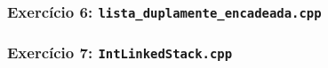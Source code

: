 \documentclass[aspectratio=169]{beamer}
\begin{document}
\begin{frame}[fragile]\frametitle{Exercício 6: \texttt{lista\_duplamente\_encadeada.cpp}}
\fontsize{5pt}{5pt}\selectfont{

}
\end{frame}

\begin{frame}[fragile]\frametitle{Exercício 7: \texttt{IntLinkedStack.cpp}}
\fontsize{3pt}{5pt}\selectfont{

}
\end{frame}

\end{document}
